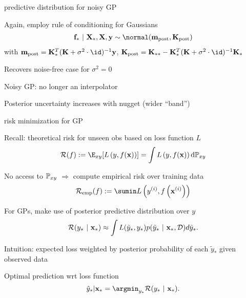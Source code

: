 \documentclass[11pt,compress,t,notes=noshow, xcolor=table]{beamer}
\begin{document}
\begin{framei}[sep=M]{predictive distribution for noisy GP}
\item Again, employ rule of conditioning for Gaussians 
\begin{eqnarray*}
\fv_* ~|~ \Xmat_*, \Xmat, \yv \sim \normal(\mv_{\text{post}}, \Kmat_\text{post})
\end{eqnarray*}
with 
$\mv_{\text{post}} = \Kstar^{T} (\Kmat+ \sigma^2 \cdot \id)^{-1}\yv$, 
$\Kmat_\text{post} = \Kstarstar - \Kstar^T (\Kmat  + \sigma^2 \cdot \id)^{-1}\Kstar$
\item Recovers noise-free case for $\sigma^2 = 0$
\item Noisy GP: no longer an interpolator 
\item Posterior uncertainty increases with nugget (wider ``band'')
\vfill
{}
\end{framei}

\begin{framei}[sep=M]{risk minimization for GP}
\item Recall: theoretical risk for unseen obs based on loss function $L$
$$\riskf := \E_{xy} [\Lxy] = \int \Lxy \text{d}\Pxy$$ 
\item No access to $\mathbb{P}_{xy}$ $\Rightarrow$ compute empirical risk over training data $$\riske(f) := \sumin \Lxyi$$ 
\item For GPs, make use of posterior predictive distribution over $y$
$$
    \mathcal{R}(y_* ~|~ \mathbf{x}_\ast) \approx \int L(\tilde y_*, y_*) p(\tilde y_*~|~\mathbf{x}_\ast, \mathcal{D})d\tilde y_*. 
  $$
\item Intuition: expected loss weighted by posterior probability of each $\tilde y_*$ given observed data
\item Optimal prediction wrt loss function
$$
    \yh_* | \xstar = \argmin_{y_*} \mathcal{R}(y_*~|~ \xstar).
  $$
\end{framei}






\end{document}
